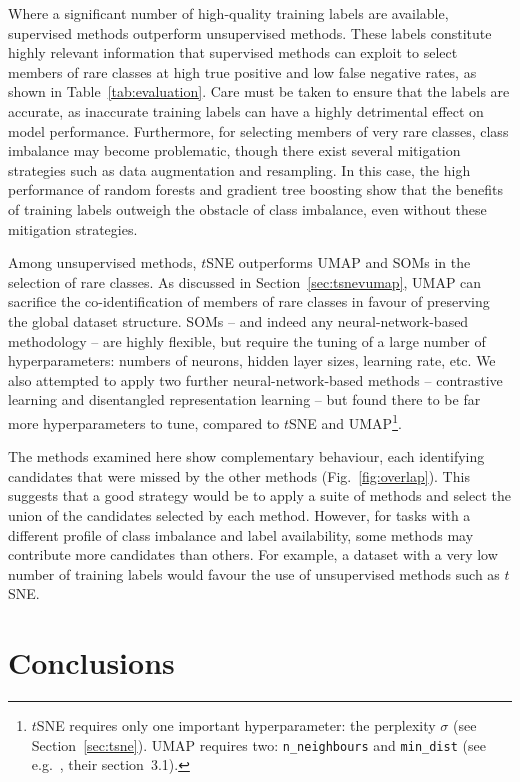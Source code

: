 \documentclass[fleqn,usenatbib]{rasti}
\begin{document}
Where a significant number of high-quality training labels are available, supervised methods outperform unsupervised methods.
These labels constitute highly relevant information that supervised methods can exploit to select members of rare classes at high true positive and low false negative rates, as shown in Table~\ref{tab:evaluation}.
Care must be taken to ensure that the labels are accurate, as inaccurate training labels can have a highly detrimental effect on model performance.
Furthermore, for selecting members of very rare classes, class imbalance may become problematic, though there exist several mitigation strategies such as data augmentation and resampling.
In this case, the high performance of random forests and gradient tree boosting show that the benefits of training labels outweigh the obstacle of class imbalance, even without these mitigation strategies.

Among unsupervised methods, $t$SNE outperforms UMAP and SOMs in the selection of rare classes.
As discussed in Section~\ref{sec:tsnevumap}, UMAP can sacrifice the co-identification of members of rare classes in favour of preserving the global dataset structure.
SOMs -- and indeed any neural-network-based methodology -- are highly flexible, but require the tuning of a large number of hyperparameters: numbers of neurons, hidden layer sizes, learning rate, etc.
We also attempted to apply two further neural-network-based methods -- contrastive learning \citep{chen20} and disentangled representation learning \citep[e.g.][]{wang24} -- but found there to be far more hyperparameters to tune, compared to $t$SNE and UMAP\footnote{
    $t$SNE requires only one important hyperparameter: the perplexity $\sigma$ (see Section~\ref{sec:tsne}).
    UMAP requires two: \texttt{n\_neighbours} and \texttt{min\_dist} (see e.g.\ \citet{kao24}, their section~3.1).
}.

The methods examined here show complementary behaviour, each identifying candidates that were missed by the other methods (Fig.~\ref{fig:overlap}).
This suggests that a good strategy would be to apply a suite of methods and select the union of the candidates selected by each method.
However, for tasks with a different profile of class imbalance and label availability, some methods may contribute more candidates than others.
For example, a dataset with a very low number of training labels would favour the use of unsupervised methods such as $t$SNE.


\section{Conclusions} \label{sec:conclusion}
\end{document}
